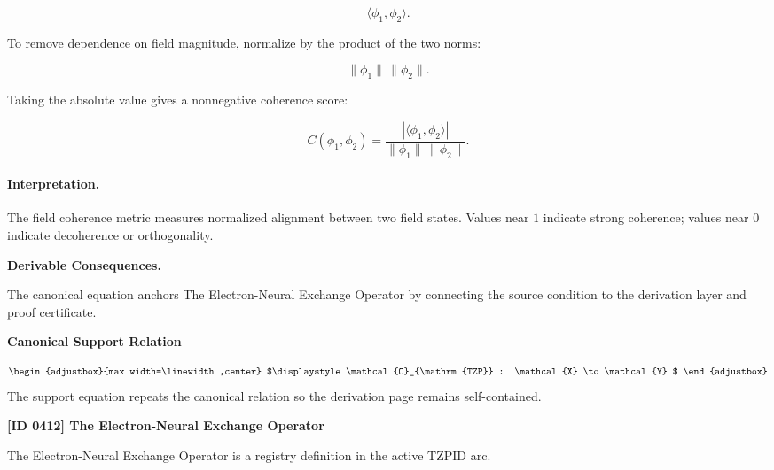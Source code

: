 \begin{equation}
\langle \phi_1,\phi_2\rangle .
\end{equation}

To remove dependence on field magnitude, normalize by the product of the two norms:

\begin{equation}
\lVert \phi_1\rVert\,\lVert \phi_2\rVert .
\end{equation}

Taking the absolute value gives a nonnegative coherence score:

\begin{equation}
\boxed{
C(\phi_1,\phi_2)
=
\frac{
\left|\langle \phi_1,\phi_2\rangle\right|
}{
\lVert \phi_1\rVert\,\lVert \phi_2\rVert
}.
}
\end{equation}

\paragraph{Interpretation.}
The field coherence metric measures normalized alignment between two field states. Values near $1$ indicate strong coherence; values near $0$ indicate decoherence or orthogonality.

\par\vspace{0.35em}
\noindent\textbf{Derivable Consequences.}\quad
\begingroup
\footnotesize
\raggedright
The canonical equation anchors The Electron-Neural Exchange Operator by connecting the source condition to the derivation layer and proof certificate.
\par\endgroup

\noindent\textbf{Canonical Support Relation}\par
\[
\begin{adjustbox}{max width=\linewidth,center}
$\displaystyle
\mathcal{O}_{\mathrm{TZP}} : \mathcal{X} \to \mathcal{Y}
$
\end{adjustbox}
\]
\noindent The support equation repeats the canonical relation so the derivation page remains self-contained.\par

\clearpage
\noindent\textbf{[ID 0412] The Electron-Neural Exchange Operator}\par
\vspace{0.35em}
\begingroup\small
{}
The Electron-Neural Exchange Operator is a registry definition in the active TZPID arc.

